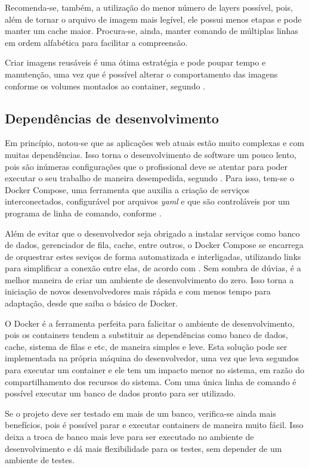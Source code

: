 \documentclass[
	12pt,				%
	openright,			%
	oneside,			%
	a4paper,			%
	chapter=TITLE,		%
	section=TITLE,		%
	english,			%
	french,				%
	spanish,			%
	brazil				%
	]{abntex2}
\begin{document}
Recomenda-se, também, a utilização do menor número de layers possível, pois, além de tornar o arquivo de imagem mais legível, ele possui menos etapas e pode manter um cache maior. Procura-se, ainda, manter comando de múltiplas linhas em ordem alfabética para facilitar a compreensão.

Criar imagens reusáveis é uma ótima estratégia e pode poupar tempo e manutenção, uma vez que é possível alterar o comportamento das imagens conforme os volumes montados ao container, segundo .

\subsection{Dependências de desenvolvimento}

Em princípio, notou-se que as aplicações web atuais estão muito complexas e com muitas dependências. Isso torna o desenvolvimento de software um pouco lento, pois são inúmeras configurações que o profissional deve se atentar para poder executar o seu trabalho de maneira desempedida, segundo . Para isso, tem-se o Docker Compose, uma ferramenta que auxilia a criação de serviços interconectados, configurável por arquivos \textit{yaml} e que são controláveis por um programa de linha de comando, conforme .

Além de evitar que o desenvolvedor seja obrigado a instalar serviços como banco de dados, gerenciador de fila, cache, entre outros, o Docker Compose se encarrega de orquestrar estes seviços de forma automatizada e interligadas, utilizando links para simplificar a conexão entre elas, de acordo com . Sem sombra de dúvias, é a melhor maneira de criar um ambiente de desenvolvimento do zero. Isso torna a iniciação de novos desenvolvedores mais rápida e com menos tempo para adaptação, desde que saiba o básico de Docker.

O Docker é a ferramenta perfeita para falicitar o ambiente de desenvolvimento, pois os containers tendem a substituir as dependências como banco de dados, cache, sistema de filas e etc, de maneira simples e leve. Esta solução pode ser implementada na própria máquina do desenvolvedor, uma vez que leva segundos para executar um container e ele tem um impacto menor no sistema, em razão do compartilhamento dos recursos do sistema. Com uma única linha de comando é possível executar um banco de dados pronto para ser utilizado.

Se o projeto deve ser testado em mais de um banco, verifica-se ainda mais benefícios, pois é possível parar e executar containers de maneira muito fácil. Isso deixa a troca de banco mais leve para ser executado no ambiente de desenvolvimento e dá mais flexibilidade para os testes, sem depender de um ambiente de testes.
\end{document}
